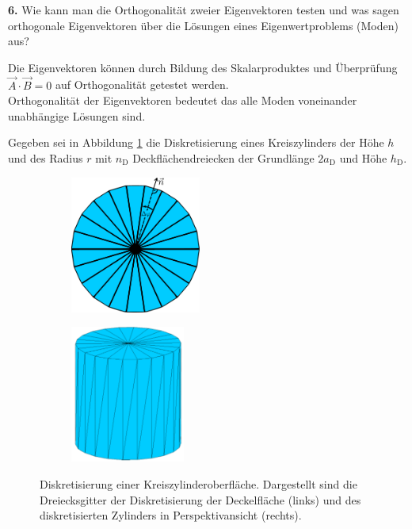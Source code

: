 \documentclass[Protokollheft.tex]{subfiles}
\begin{document}
    \begin{framed}
	\noindent \textbf{6.} Wie kann man die Orthogonalität zweier Eigenvektoren testen und was sagen orthogonale Eigenvektoren über die Lösungen eines Eigenwertproblems (Moden) aus?\label{exer:orthogonalEV}
\end{framed}



Die Eigenvektoren können durch Bildung des Skalarproduktes und Überprüfung $\vec{A} \cdot \vec{B} = 0$ auf Orthogonalität getestet werden. \\
Orthogonalität der Eigenvektoren bedeutet das alle Moden  voneinander unabhängige Lösungen sind. 


    \noindent Gegeben sei in Abbildung \ref{fig:zylGitter} die Diskretisierung eines Kreiszylinders der Höhe $h$ und des Radius $r$ mit $n_\mathrm{D}$ Deckflächendreiecken der Grundlänge $2a_\text{D}$ und Höhe $h_\text{D}$.\\
	\begin{figure}[h]
		\centering
		\begin{subfigure}{0.49\textwidth}
			\centering
			\includegraphics[height=4.5cm]{v1_zylinder1.pdf}
		\end{subfigure}
		\begin{subfigure}{0.49\textwidth}
			\centering
			\includegraphics[height=4.5cm]{v1_zylinder2.pdf}
		\end{subfigure}
		\caption{Diskretisierung einer Kreiszylinderoberfläche. Dargestellt sind die Dreiecksgitter der Diskretisierung der Deckelfläche (links) und des diskretisierten Zylinders in Perspektivansicht (rechts).}\label{fig:zylGitter}
	\end{figure}
\end{document}
